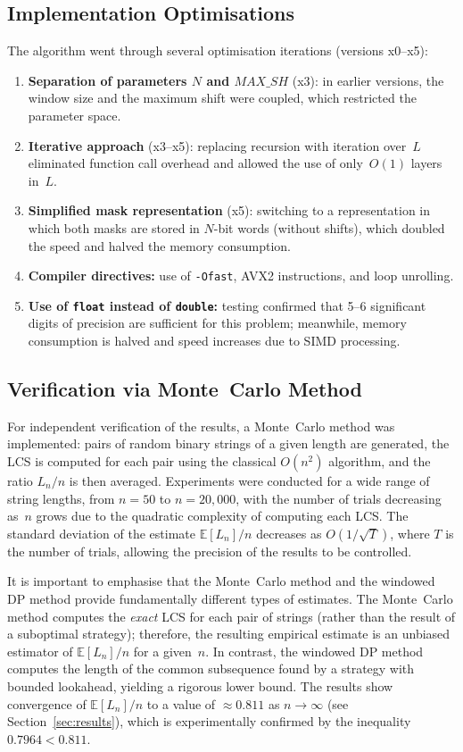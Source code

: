 \documentclass[12pt,a4paper]{article}
\begin{document}
\subsection{Implementation Optimisations}
The algorithm went through several optimisation iterations (versions x0--x5):
\begin{enumerate}
  \item \textbf{Separation of parameters $N$ and $\mathit{MAX\_SH}$} (x3): in earlier versions, the window size and the maximum shift were coupled, which restricted the parameter space.
  \item \textbf{Iterative approach} (x3--x5): replacing recursion with iteration over~$L$ eliminated function call overhead and allowed the use of only~$O(1)$ layers in~$L$.
  \item \textbf{Simplified mask representation} (x5): switching to a representation in which both masks are stored in $N$-bit words (without shifts), which doubled the speed and halved the memory consumption.
  \item \textbf{Compiler directives:} use of \texttt{-Ofast}, AVX2 instructions, and loop unrolling.
  \item \textbf{Use of \texttt{float} instead of \texttt{double}:} testing confirmed that 5--6 significant digits of precision are sufficient for this problem; meanwhile, memory consumption is halved and speed increases due to SIMD processing.
\end{enumerate}

\subsection{Verification via Monte~Carlo Method}
For independent verification of the results, a Monte~Carlo method was implemented: pairs of random binary strings of a given length are generated, the LCS is computed for each pair using the classical $O(n^2)$ algorithm, and the ratio $L_n / n$ is then averaged.
Experiments were conducted for a wide range of string lengths, from $n = 50$ to $n = 20{,}000$, with the number of trials decreasing as~$n$ grows due to the quadratic complexity of computing each LCS.
The standard deviation of the estimate $\mathbb{E}[L_n]/n$ decreases as $O(1/\sqrt{T})$, where $T$ is the number of trials, allowing the precision of the results to be controlled.

It is important to emphasise that the Monte~Carlo method and the windowed DP method provide fundamentally different types of estimates.
The Monte~Carlo method computes the \emph{exact} LCS for each pair of strings (rather than the result of a suboptimal strategy); therefore, the resulting empirical estimate is an unbiased estimator of $\mathbb{E}[L_n]/n$ for a given~$n$.
In contrast, the windowed DP method computes the length of the common subsequence found by a strategy with bounded lookahead, yielding a rigorous lower bound.
The results show convergence of $\mathbb{E}[L_n]/n$ to a value of $\approx 0.811$ as $n \to \infty$ (see Section~\ref{sec:results}), which is experimentally confirmed by the inequality $0.7964 < 0.811$.
\end{document}
